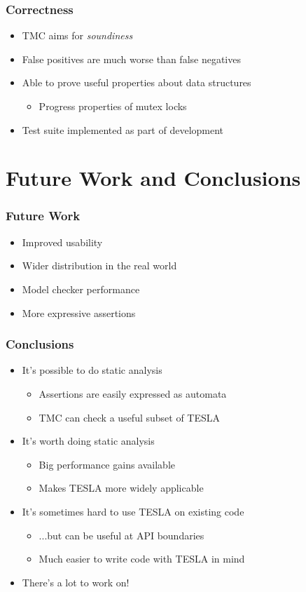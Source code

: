 \documentclass{beamer}
\begin{document}
\begin{frame}
  \frametitle{Correctness}

  \begin{itemize}
    \item TMC aims for \emph{soundiness}
    \item False positives are much worse than false negatives
    \item Able to prove useful properties about data structures
      \begin{itemize}
        \item Progress properties of mutex locks
      \end{itemize}
    \item Test suite implemented as part of development
  \end{itemize}
\end{frame}

\section{Future Work and Conclusions}

\begin{frame}
  \frametitle{Future Work}

  \begin{itemize}
    \item Improved usability
    \item Wider distribution in the real world
    \item Model checker performance
    \item More expressive assertions
  \end{itemize}
\end{frame}

\begin{frame}
  \frametitle{Conclusions}

  \begin{itemize}
    \item It's possible to do static analysis
      \begin{itemize}
        \item Assertions are easily expressed as automata
        \item TMC can check a useful subset of TESLA
      \end{itemize}
    \item It's worth doing static analysis
      \begin{itemize}
        \item Big performance gains available
        \item Makes TESLA more widely applicable
      \end{itemize}
    \item It's sometimes hard to use TESLA on existing code
      \begin{itemize}
        \item ...but can be useful at API boundaries
        \item Much easier to write code with TESLA in mind
      \end{itemize}
    \item There's a lot to work on!
  \end{itemize}
\end{frame}
\end{document}

